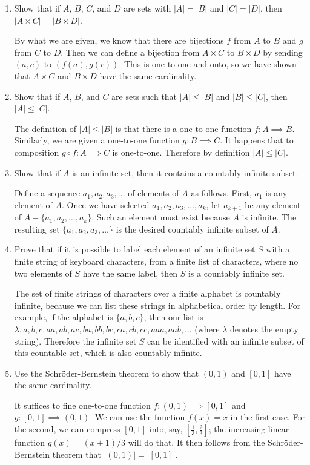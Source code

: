 \documentclass[11pt]{article}
\begin{document}
\begin{enumerate}[label=\textbf{\arabic*.}]
	\item Show that if $A$, $B$, $C$, and $D$ are sets with $|A| = |B|$ and $|C| = |D|$, then $|A \times C| = |B \times D|$.
	
	By what we are given, we know that there are bijections $f$ from $A$ to $B$ and $g$ from $C$ to $D$. Then we can define a bijection from $A \times C$ to $B \times D$ by sending $(a, c)$ to $(f(a), g(c))$. This is one-to-one and onto, so we have shown that $A \times C$ and $B \times D$ have the same cardinality.
	
	\item Show that if $A$, $B$, and $C$ are sets such that $|A| \leq |B|$ and $|B| \leq |C|$, then $|A| \leq |C|$.
	
	The definition of $|A| \leq |B|$ is that there is a one-to-one function $f : A \implies B$. Similarly, we are given a one-to-one function $g : B \implies C$. It happens that to composition $g \circ f : A \implies C$ is one-to-one. Therefore by definition $|A| \leq |C|$.
	
	\item Show that if $A$ is an infinite set, then it contains a countably infinite subset.
	
	Define a sequence $a_1, a_2, a_3, \ldots$ of elements of $A$ as follows. First, $a_1$ is any element of $A$. Once we have selected $a_1, a_2, a_3, \ldots, a_k$, let $a_{k + 1}$ be any element of $A - \{a_1, a_2, \ldots, a_k\}$. Such an element must exist because $A$ is infinite. The resulting set $\{a_1, a_2, a_3, \ldots\}$ is the desired countably infinite subset of $A$.
	
	\item Prove that if it is possible to label each element of an infinite set $S$ with a finite string of keyboard characters, from a finite list of characters, where no two elements of $S$ have the same label, then $S$ is a countably infinite set.
	
	The set of finite strings of characters over a finite alphabet is countably infinite, because we can list these strings in alphabetical order by length. For example, if the alphabet is $\{a, b, c\}$, then our list is $\lambda, a, b, c, aa, ab, ac, ba, bb, bc, ca, cb, cc, aaa, aab, \ldots$ (where $\lambda$ denotes the empty string). Therefore the infinite set $S$ can be identified with an infinite subset of this countable set, which is also countably infinite.
	
	\item Use the Schr{\"o}der-Bernstein theorem to show that $(0, 1)$ and $[0, 1]$ have the same cardinality.
	
	It suffices to fine one-to-one function $f : (0, 1) \implies [0, 1]$ and $g : [0, 1] \implies (0, 1)$. We can use the function $f(x) = x$ in the first case. For the second, we can compress $[0, 1]$ into, say, $[\frac{1}{3}, \frac{2}{3}]$; the increasing linear function $g(x) = (x + 1) / 3$ will do that. It then follows from the Schr{\"o}der-Bernstein theorem that $|(0, 1)| = |[0, 1]|$.
\end{enumerate}
\end{document}
